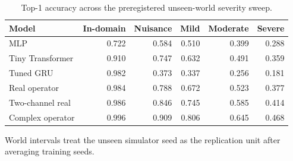 \begin{table}[t]
\centering
\caption{Top-1 accuracy across the preregistered unseen-world severity sweep.}
\label{tab:world_robustness}
\begin{tabular}{lrrrrr}
\toprule
Model & In-domain & Nuisance & Mild & Moderate & Severe \\
\midrule
MLP & 0.722 & 0.584 & 0.510 & 0.399 & 0.288 \\
Tiny Transformer & 0.910 & 0.747 & 0.632 & 0.491 & 0.359 \\
Tuned GRU & 0.982 & 0.373 & 0.337 & 0.256 & 0.181 \\
Real operator & 0.984 & 0.788 & 0.672 & 0.523 & 0.377 \\
Two-channel real & 0.986 & 0.846 & 0.745 & 0.585 & 0.414 \\
Complex operator & 0.996 & 0.909 & 0.806 & 0.645 & 0.468 \\
\bottomrule
\end{tabular}
\begin{minipage}{0.96\linewidth}\footnotesize World intervals treat the unseen simulator seed as the replication unit after averaging training seeds.\end{minipage}
\end{table}
